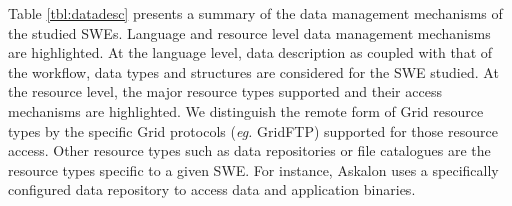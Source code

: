 Table \ref{tbl:datadesc} presents a summary of the data management mechanisms
of the studied SWEs. Language and resource level data management mechanisms are
highlighted. At the language level, data description as coupled with that of
the workflow, data types and structures are considered for the SWE studied. At
the resource level, the major resource types supported and their access
mechanisms are highlighted. We distinguish the remote form of Grid resource
types by the specific Grid protocols (\textit{eg.} GridFTP) supported for those
resource access. Other resource types such as data repositories or file
catalogues are the resource types specific to a given SWE. For instance,
Askalon uses a specifically configured data repository to access data and
application binaries.

